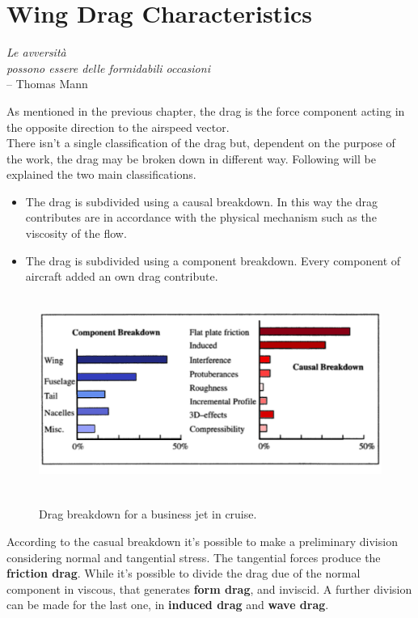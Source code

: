 \chapter{Wing Drag Characteristics}

\label{ch:wingdrag}

\begin{flushright}
	{\smaller
		\textit{Le avversità\\ possono essere delle formidabili occasioni}\\
		-- Thomas Mann}
\end{flushright}


As mentioned in the previous chapter, the drag is the force component acting in the opposite direction to the airspeed vector.\\
There isn't a single classification of the drag but, dependent on the purpose of the work, the drag may be broken down in different way. Following will be explained the two main classifications.

\begin{itemize}
\item The drag is subdivided using a causal breakdown. In this way the drag contributes are in accordance with the physical mechanism such as the viscosity of the flow.
\item The drag is subdivided using a component breakdown. Every component of aircraft added an own drag contribute.
\end{itemize}

\begin{figure}[H]
\centering
{\includegraphics[height=6.4cm]{Immagini/component.png}} 
\caption{Drag breakdown for a business jet in cruise.}
\end{figure}

According to the casual breakdown it's possible to make a preliminary division considering normal and tangential stress. The tangential forces produce the {\bfseries friction drag}. While it's possible to divide the drag due of the normal component in viscous, that generates {\bfseries form drag}, and inviscid. A further division can be made for the last one, in {\bfseries induced drag}  and {\bfseries wave drag}.\\

